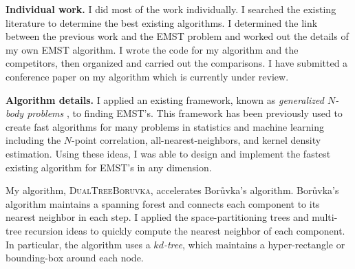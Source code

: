 \documentclass[twoside,leqno, 12pt]{article}
\begin{document}
\textbf{Individual work.}  I did most of the work individually.  I searched the existing literature to determine the best existing algorithms.  I determined the link between the previous work and the EMST problem and worked out the details of my own EMST algorithm.  I wrote the code for my algorithm and the competitors, then organized and carried out the comparisons.  I have submitted a conference paper on my algorithm which is currently under review.  

%



\textbf{Algorithm details.}  I applied an existing framework, known as \emph{generalized $N$-body problems} \cite{gray_nbody}, to finding EMST's.  This framework has been previously used to create fast algorithms for many problems in statistics and machine learning including the $N$-point correlation, all-nearest-neighbors, and kernel density estimation.  Using these ideas, I was able to design and implement the fastest existing algorithm for EMST's in any dimension.  
 
My algorithm, \textsc{DualTreeBoruvka}, accelerates Bor\r{u}vka's algorithm.  Bor\r{u}vka's algorithm maintains a spanning forest and connects each component to its nearest neighbor in each step.  I applied the space-partitioning trees and multi-tree recursion ideas to quickly compute the nearest neighbor of each component.  In particular, the algorithm uses a \emph{$kd$-tree}, which maintains a hyper-rectangle or bounding-box around each node.


\end{document}
